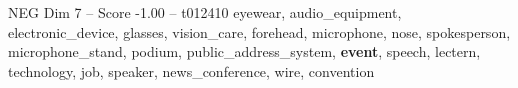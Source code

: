 \begin{textsample}{NEG Dim 7 – Score -1.00 – t012410}  \label{ex:f7_neg_031}
eyewear, audio\_equipment, electronic\_device, glasses, vision\_care, forehead, microphone, nose, spokesperson, microphone\_stand, podium, public\_address\_system, \textbf{event}, speech, lectern, technology, job, speaker, news\_conference, wire, convention

\end{textsample}
